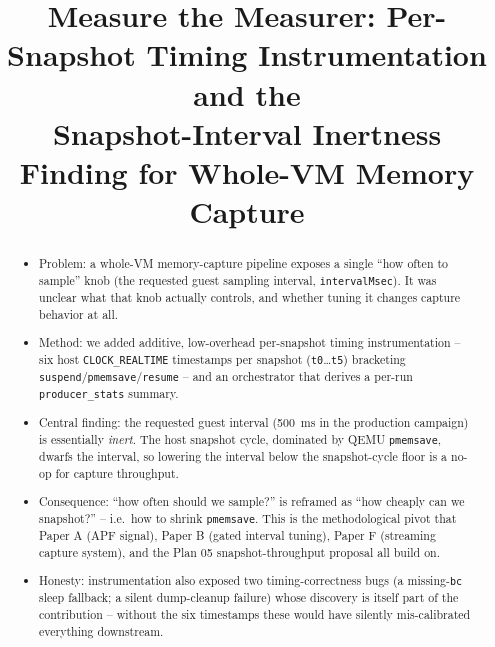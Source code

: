 \documentclass[conference]{IEEEtran}
\title{Measure the Measurer: Per-Snapshot Timing Instrumentation and the\\
Snapshot-Interval Inertness Finding for Whole-VM Memory Capture}
\author{\IEEEauthorblockN{TODO Author list}
\IEEEauthorblockA{TODO Affiliation\\
\texttt{TODO@email}}}
\begin{document}
\maketitle

\begin{abstract}
\begin{itemize}
  \item Problem: a whole-VM memory-capture pipeline exposes a single
        ``how often to sample'' knob (the requested guest sampling interval,
        \texttt{intervalMsec}). It was unclear what that knob actually
        controls, and whether tuning it changes capture behavior at all.
  \item Method: we added additive, low-overhead per-snapshot timing
        instrumentation -- six host \texttt{CLOCK\_REALTIME} timestamps per
        snapshot (\texttt{t0}\dots\texttt{t5}) bracketing
        \texttt{suspend}/\texttt{pmemsave}/\texttt{resume} -- and an
        orchestrator that derives a per-run \texttt{producer\_stats} summary.
  \item Central finding: the requested guest interval (\SI{500}{\milli\second}
        in the production campaign) is essentially \emph{inert}. The host
        snapshot cycle, dominated by QEMU \texttt{pmemsave}, dwarfs the
        interval, so lowering the interval below the snapshot-cycle floor is
        a no-op for capture throughput.
  \item Consequence: ``how often should we sample?'' is reframed as ``how
        cheaply can we snapshot?'' -- i.e.\ how to shrink \texttt{pmemsave}.
        This is the methodological pivot that Paper A (APF signal), Paper B
        (gated interval tuning), Paper F (streaming capture system), and the
        Plan 05 snapshot-throughput proposal all build on.
  \item Honesty: instrumentation also exposed two timing-correctness bugs (a
        missing-\texttt{bc} sleep fallback; a silent dump-cleanup failure)
        whose discovery is itself part of the contribution -- without the six
        timestamps these would have silently mis-calibrated everything
        downstream.
\end{itemize}
\end{abstract}

\end{document}

